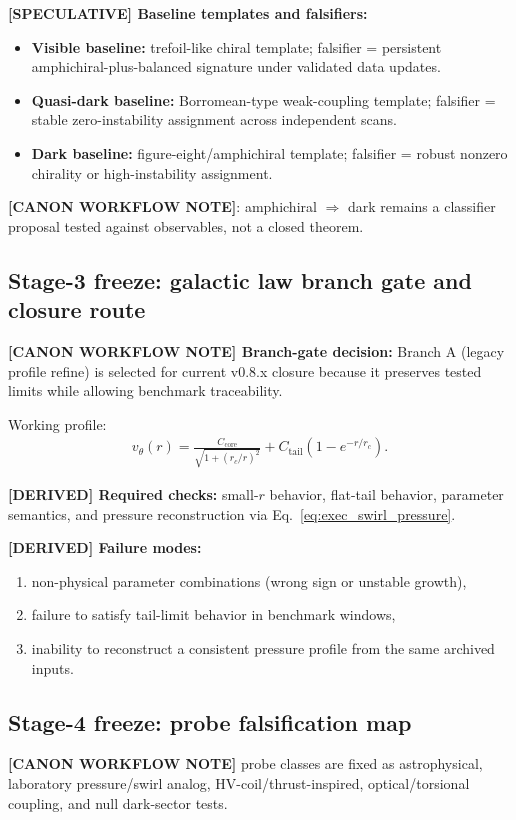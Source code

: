 \textbf{[SPECULATIVE] Baseline templates and falsifiers:}
\begin{itemize}
    \item \textbf{Visible baseline:} trefoil-like chiral template; falsifier = persistent amphichiral-plus-balanced signature under validated data updates.
    \item \textbf{Quasi-dark baseline:} Borromean-type weak-coupling template; falsifier = stable zero-instability assignment across independent scans.
    \item \textbf{Dark baseline:} figure-eight/amphichiral template; falsifier = robust nonzero chirality or high-instability assignment.
\end{itemize}

\textbf{[CANON WORKFLOW NOTE]}:
amphichiral $\Rightarrow$ dark remains a classifier proposal tested against observables, not a closed theorem.

\subsection{Stage-3 freeze: galactic law branch gate and closure route}
\textbf{[CANON WORKFLOW NOTE] Branch-gate decision:} Branch A (legacy profile refine) is selected for current v0.8.x closure because it preserves tested limits while allowing benchmark traceability.

Working profile:
\begin{align}
    v_\theta(r)
    =
    \frac{C_{\mathrm{core}}}{\sqrt{1+(r_c/r)^2}}
    +
    C_{\mathrm{tail}}\left(1-e^{-r/r_c}\right).
\end{align}

\textbf{[DERIVED] Required checks:}
small-$r$ behavior, flat-tail behavior, parameter semantics, and pressure reconstruction via Eq.~\eqref{eq:exec_swirl_pressure}.

\textbf{[DERIVED] Failure modes:}
\begin{enumerate}
    \item non-physical parameter combinations (wrong sign or unstable growth),
    \item failure to satisfy tail-limit behavior in benchmark windows,
    \item inability to reconstruct a consistent pressure profile from the same archived inputs.
\end{enumerate}

\subsection{Stage-4 freeze: probe falsification map}
\textbf{[CANON WORKFLOW NOTE]} probe classes are fixed as astrophysical, laboratory pressure/swirl analog, HV-coil/thrust-inspired, optical/torsional coupling, and null dark-sector tests.

